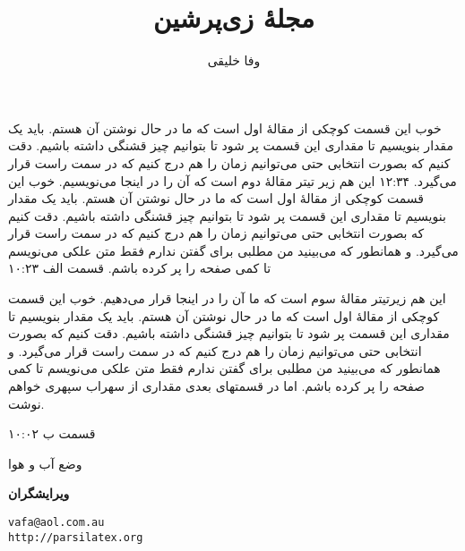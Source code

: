 \documentclass[12pt,twoside]{xepersian-magazine}
\title{مجلهٔ زی‌پرشین}
\author{وفا خلیقی}
\begin{document}
\begin{frontpage}
						{خوب این قسمت کوچکی از مقالهٔ اول است که ما در حال نوشتن آن هستم. باید یک مقدار بنویسیم تا مقداری این قسمت پر شود تا بتوانیم چیز قشنگی داشته باشیم. دقت کنیم که بصورت انتخابی حتی می‌توانیم زمان را هم درج کنیم که در سمت راست قرار می‌گیرد.}%
						{۱۲:۳۴}
%
						{این هم زیر تیتر مقالهٔ دوم است که آن را در اینجا می‌نویسیم.}%
						{خوب این قسمت کوچکی از مقالهٔ اول است که ما در حال نوشتن آن هستم. باید یک مقدار بنویسیم تا مقداری این قسمت پر شود تا بتوانیم چیز قشنگی داشته باشیم. دقت کنیم که بصورت انتخابی حتی می‌توانیم زمان را هم درج کنیم که در سمت راست قرار می‌گیرد. و همانطور که می‌بینید من مطلبی برای گفتن ندارم فقط متن علکی می‌نویسم تا کمی صفحه را پر کرده باشم.}%
						{قسمت الف}%
						{۱۰:۲۳}

%
					{این هم زیرتیتر مقالهٔ سوم است که ما آن را در اینجا قرار می‌دهیم.}%
					{خوب این قسمت کوچکی از مقالهٔ اول است که ما در حال نوشتن آن هستم. باید یک مقدار بنویسیم تا مقداری این قسمت پر شود تا بتوانیم چیز قشنگی داشته باشیم. دقت کنیم که بصورت انتخابی حتی می‌توانیم زمان را هم درج کنیم که در سمت راست قرار می‌گیرد. و همانطور که می‌بینید من مطلبی برای گفتن ندارم فقط متن علکی می‌نویسم تا کمی صفحه را پر کرده باشم. اما در قسمتهای بعدی مقداری از سهراب سپهری خواهم نوشت.}%
					
					{قسمت ب}%
					{۱۰:۰۲}


\begin{weatherblock}{وضع آب و هوا}
\end{weatherblock}


\begin{authorblock}
\textbf{ویرایشگران}


\texttt{vafa@aol.com.au\\[5pt]
http://parsilatex.org}\\
\end{authorblock}
\end{frontpage}
\end{document}
